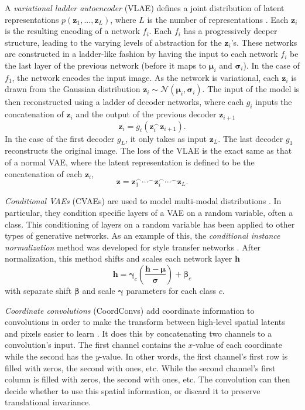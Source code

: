 \documentclass{article}
\begin{document}
A \emph{variational ladder autoencoder} (VLAE) defines a joint distribution of latent representations $p(\textbf{z}_1, ..., \textbf{z}_L)$, where $L$ is the number of representations \cite{zhao:learning}.
Each $\textbf{z}_i$ is the resulting encoding of a network $f_i$.
Each $f_i$ has a progressively deeper structure, leading to the varying levels of abstraction for the $\textbf{z}_i$'s.
These networks are constructed in a ladder-like fashion by having the input to each network $f_i$ be the last layer of the previous network (before it maps to $\pmb{\mu}_i$ and $\pmb{\sigma}_i$).
In the case of $f_1$, the network encodes the input image.
As the network is variational, each $\textbf{z}_i$ is drawn from the Gaussian distribution
$\textbf{z}_i \sim \mathcal{N}(\pmb{\mu}_i, \pmb{\sigma}_i).$
The input of the model is then reconstructed using a ladder of decoder networks, where each $g_i$ inputs the concatenation of $\textbf{z}_i$ and the output of the previous decoder $\textbf{\~z}_{i+1}$
$$ \textbf{\~z}_i = g_i(\textbf{z}_i^\frown\textbf{\~z}_{i+1}).$$
In the case of the first decoder $g_L$, it only takes as input $\textbf{z}_L$.
The last decoder $g_1$ reconstructs the original image.
The loss of the VLAE is the exact same as that of a normal VAE, where the latent representation is defined to be the concatenation of each $\textbf{z}_i$,
$$\textbf{z} = \textbf{z}_1^\frown\cdots^\frown\textbf{z}_i^\frown\cdots^\frown\textbf{z}_L.$$

\emph{Conditional VAEs} (CVAEs) are used to model multi-modal distributions \cite{sohn:learning}.
In particular, they condition specific layers of a VAE on a random variable, often a class.
This conditioning of layers on a random variable has been applied to other types of generative networks.
As an example of this, the \emph{conditional instance normalization} method was developed for style transfer networks \cite{dumoulin:alearned}.
After normalization, this method shifts and scales each network layer $\textbf{h}$
$$\textbf{h} = \pmb{\gamma}_c (\frac{\textbf{h} - \pmb{\mu}}{\pmb{\sigma}}) + \pmb{\beta}_c$$
with separate shift $\pmb{\beta}$ and scale $\pmb{\gamma}$ parameters for each class $c$.

\emph{Coordinate convolutions} (CoordConvs) add coordinate information to convolutions in order to make the transform between high-level spatial latents and pixels easier to learn \cite{liu:anIntriguing}.
It does this by concatenating two channels to a convolution's input.
The first channel contains the $x$-value of each coordinate while the second has the $y$-value.
In other words, the first channel's first row is filled with zeros, the second with ones, etc.
While the second channel's first column is filled with zeros, the second with ones, etc.
The convolution can then decide whether to use this spatial information, or discard it to preserve translational invariance.
\end{document}
